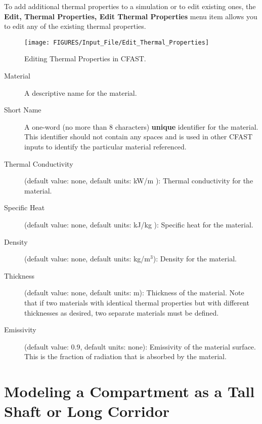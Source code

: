To add additional thermal properties to a simulation or to edit existing ones, the \textbf{Edit, Thermal Properties, Edit Thermal Properties} menu item allows you to edit any of the existing thermal properties.

\begin{figure}[h!]
\begin{center}
\texttt{[image: FIGURES/Input\_File/Edit\_Thermal\_Properties]}
\caption[Editing Thermal Properties in CFAST]{Editing Thermal Properties in CFAST.}
\end{center}
\end{figure}

\begin{description}
\item[Material] A descriptive name for the material.

\item[Short Name] A one-word (no more than 8 characters) \textbf{unique} identifier for the material.  This identifier should not contain any spaces and is used in other CFAST inputs to identify the particular material referenced.

\item[Thermal Conductivity] (default value: none, default units: kW/m \degc): Thermal conductivity for the material.

\item[Specific Heat] (default value: none, default units: kJ/kg \degc): Specific heat for the material.

\item[Density] (default value: none, default units: kg/m$^3$): Density for the material.

\item[Thickness] (default value: none, default units: m): Thickness of the material.  Note that if two materials with identical thermal properties but with different thicknesses as desired, two separate materials must be defined.

\item[Emissivity] (default value: 0.9, default units: none): Emissivity of the material surface.  This is the fraction of radiation that is absorbed by the material.
\end{description}


\section{Modeling a Compartment as a Tall Shaft or Long Corridor}

